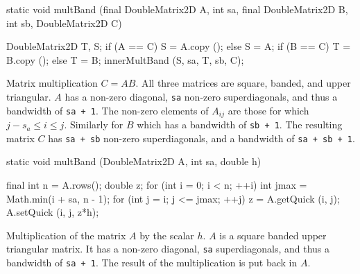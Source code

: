 \begin{hide}
\begin{code}

   static void multBand (final DoubleMatrix2D A, int sa,
                                final DoubleMatrix2D B, int sb,
                                DoubleMatrix2D C) \begin{hide} {
      DoubleMatrix2D T, S;
      if (A == C)
         S = A.copy ();
      else
         S = A;
      if (B == C)
         T = B.copy ();
      else
         T = B;
      innerMultBand (S, sa, T, sb, C);
   } \end{hide}
\end{code}
\begin{tabb} Matrix multiplication $C = AB$. All three matrices are square,
banded, and upper triangular. $A$ has a non-zero diagonal, \texttt{sa} non-zero
 superdiagonals, and thus a bandwidth of \texttt{sa + 1}.
The non-zero elements of $A_{ij}$ are those for which $j - s_a \le i \le j$.
Similarly for $B$ which has a bandwidth of \texttt{sb + 1}.
The resulting matrix $C$ has \texttt{sa + sb} non-zero superdiagonals, and a
bandwidth of \texttt{sa + sb + 1}.
\end{tabb}
\begin{htmlonly}
\end{htmlonly}
\begin{code}

   static void multBand (DoubleMatrix2D A, int sa, double h) \begin{hide} {
      final int n = A.rows();
      double z;
      for (int i = 0; i < n; ++i) {
         int jmax = Math.min(i + sa, n - 1);
         for (int j = i; j <= jmax; ++j) {
            z = A.getQuick (i, j);
            A.setQuick (i, j, z*h);
         }
      }
   } \end{hide}
\end{code}
\begin{tabb} Multiplication of the matrix $A$ by the scalar $h$.
$A$ is a square banded upper triangular matrix. It has a non-zero diagonal,
\texttt{sa} superdiagonals, and thus a bandwidth of \texttt{sa + 1}.
The result of the multiplication is put back in $A$.
\end{tabb}
\begin{htmlonly}
\end{htmlonly}
\begin{code}


\end{code}
\end{hide}
